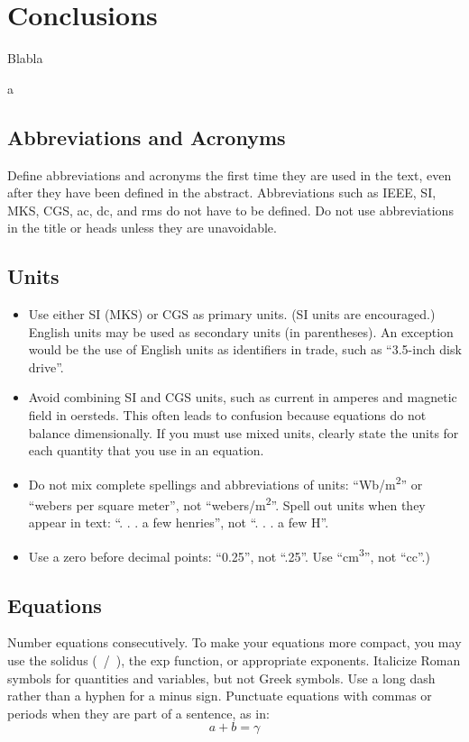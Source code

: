 \documentclass[conference]{IEEEtran}
\begin{document}
\section{Conclusions}
Blabla 

\newpage
a
\newpage














\subsection{Abbreviations and Acronyms}\label{AA}
Define abbreviations and acronyms the first time they are used in the text, 
even after they have been defined in the abstract. Abbreviations such as 
IEEE, SI, MKS, CGS, ac, dc, and rms do not have to be defined. Do not use 
abbreviations in the title or heads unless they are unavoidable.

\subsection{Units}
\begin{itemize}
\item Use either SI (MKS) or CGS as primary units. (SI units are encouraged.) English units may be used as secondary units (in parentheses). An exception would be the use of English units as identifiers in trade, such as ``3.5-inch disk drive''.
\item Avoid combining SI and CGS units, such as current in amperes and magnetic field in oersteds. This often leads to confusion because equations do not balance dimensionally. If you must use mixed units, clearly state the units for each quantity that you use in an equation.
\item Do not mix complete spellings and abbreviations of units: ``Wb/m\textsuperscript{2}'' or ``webers per square meter'', not ``webers/m\textsuperscript{2}''. Spell out units when they appear in text: ``. . . a few henries'', not ``. . . a few H''.
\item Use a zero before decimal points: ``0.25'', not ``.25''. Use ``cm\textsuperscript{3}'', not ``cc''.)
\end{itemize}

\subsection{Equations}
Number equations consecutively. To make your 
equations more compact, you may use the solidus (~/~), the exp function, or 
appropriate exponents. Italicize Roman symbols for quantities and variables, 
but not Greek symbols. Use a long dash rather than a hyphen for a minus 
sign. Punctuate equations with commas or periods when they are part of a 
sentence, as in:
\begin{equation}
a+b=\gamma\label{eq}
\end{equation}
\end{document}
